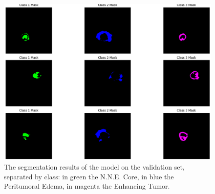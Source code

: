 \documentclass[10pt,twocolumn,letterpaper]{article}
\begin{document}
\begin{figure}
\centering
\includegraphics[width=\linewidth]{img/SeparatedColor.png}
\caption{The segmentation results of the model on the validation set, separated by class: in green the N.N.E. Core, in blue the Peritumoral Edema, in magenta the Enhancing Tumor.}
\label{tab:results}
\end{figure}
\end{document}
